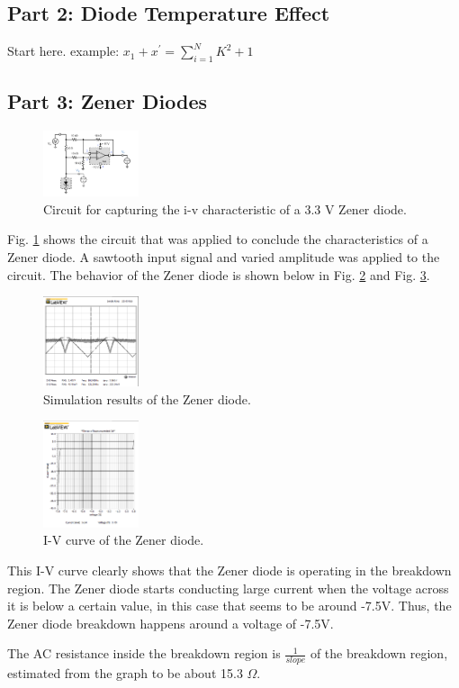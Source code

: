 \documentclass[letterpaper, 10 pt, conference]{ieeeconf}  %
\begin{document}
\subsection{Part 2: Diode Temperature Effect}
Start here.\newline
example: $x_{1}+x^{'} = \sum_{i=1}^N{K^{2}+1}$
\subsection{Part 3: Zener Diodes}
\begin{figure}[h]
  \centering
  \includegraphics[width=0.25\textwidth]{images/zener_circuit.png}
  \caption{Circuit for capturing the i-v characteristic of a 3.3 V Zener diode.}
  \label{fig:zener_1}
\end{figure}
Fig. \ref{fig:zener_1} shows the circuit that was applied to conclude the characteristics of
a Zener diode. A sawtooth input signal and varied amplitude was applied to the circuit. The behavior
of the Zener diode is shown below in Fig. \ref{fig:zener_2} and Fig. \ref{fig:zener_3}.
\begin{figure}[h]
  \centering
  \includegraphics[width=0.25\textwidth]{images/zener_simu.png}
  \caption{Simulation results of the Zener diode.}
  \label{fig:zener_2}
\end{figure}
\begin{figure}[h]
  \centering
  \includegraphics[width=0.25\textwidth]{images/zener_iv.png}
  \caption{I-V curve of the Zener diode.}
  \label{fig:zener_3}
\end{figure}
This I-V curve clearly shows that the Zener diode is operating in the breakdown region.
The Zener diode starts conducting large current when the voltage across it is below
a certain value, in this case that seems to be around -7.5V.
Thus, the Zener diode breakdown happens around a voltage of -7.5V.
\par The AC resistance inside the breakdown region is $\frac{1}{slope}$ of the breakdown region,
estimated from the graph to be about 15.3 $\Omega$.
\end{document}
